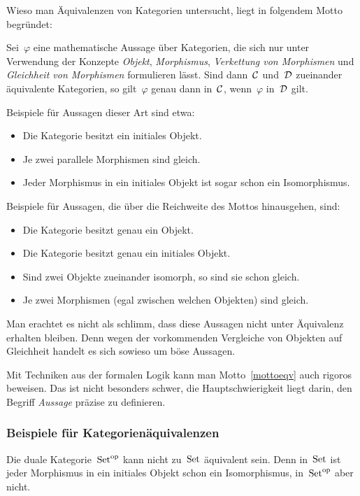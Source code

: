 Wieso man Äquivalenzen von Kategorien untersucht, liegt in folgendem
Motto begründet:
\begin{motto}\label{mottoeqv}%
Sei~$\varphi$ eine mathematische Aussage über Kategorien, die
sich nur unter Verwendung der Konzepte \emph{Objekt}, \emph{Morphismus},
\emph{Verkettung von Morphismen} und \emph{Gleichheit von Morphismen}
formulieren lässt. Sind dann~$\mathcal{C}$ und~$\mathcal{D}$ zueinander äquivalente Kategorien,
so gilt~$\varphi$ genau dann in~$\mathcal{C}$, wenn~$\varphi$ in~$\mathcal{D}$ gilt.
\end{motto}
Beispiele für Aussagen dieser Art sind etwa:
\begin{itemize}
\item Die Kategorie besitzt ein initiales Objekt.
\item Je zwei parallele Morphismen sind gleich.
\item Jeder Morphismus in ein initiales Objekt ist sogar schon ein
Isomorphismus.
\end{itemize}
Beispiele für Aussagen, die über die Reichweite des Mottos hinausgehen, sind:
\begin{itemize}
\item Die Kategorie besitzt genau ein Objekt.
\item Die Kategorie besitzt genau ein initiales Objekt.
\item Sind zwei Objekte zueinander isomorph, so sind sie schon gleich.
\item Je zwei Morphismen (egal zwischen welchen Objekten) sind gleich.
\end{itemize}
Man erachtet es nicht als schlimm, dass diese Aussagen nicht unter Äquivalenz
erhalten bleiben. Denn wegen der vorkommenden Vergleiche von Objekten auf Gleichheit
handelt es sich sowieso um böse Aussagen.

\begin{bem}Mit Techniken aus der formalen Logik kann man Motto~\ref{mottoeqv}
auch rigoros beweisen. Das ist nicht besonders schwer, die Hauptschwierigkeit
liegt darin, den Begriff \emph{Aussage} präzise zu definieren.\end{bem}


\subsubsection*{Beispiele für Kategorienäquivalenzen}

\begin{bsp}\label{setopset}%
Die duale Kategorie~$\mathrm{Set}^{\mathrm{op}}$ kann nicht zu~$\mathrm{Set}$ äquivalent sein.
Denn in~$\mathrm{Set}$ ist jeder Morphismus in ein initiales Objekt schon ein
Isomorphismus, in~$\mathrm{Set}^{\mathrm{op}}$ aber nicht.\end{bsp}

